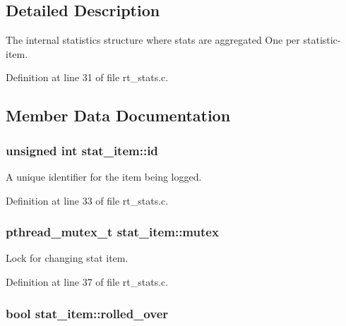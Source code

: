 \subsection{Detailed Description}
The internal statistics structure where stats are aggregated One per statistic-\/item. 

Definition at line 31 of file rt\-\_\-stats.\-c.



\subsection{Member Data Documentation}
\hypertarget{structstat__item_a8f48ef423c6bb652d59e567f3585f6bd}{
\subsubsection[{id}]{\setlength{\rightskip}{0pt plus 5cm}unsigned int stat\-\_\-item\-::id}}\label{structstat__item_a8f48ef423c6bb652d59e567f3585f6bd}


A unique identifier for the item being logged. 



Definition at line 33 of file rt\-\_\-stats.\-c.

\hypertarget{structstat__item_a5dc6d221657bec60e0613ef64ea6ee28}{
\subsubsection[{mutex}]{\setlength{\rightskip}{0pt plus 5cm}pthread\-\_\-mutex\-\_\-t stat\-\_\-item\-::mutex}}\label{structstat__item_a5dc6d221657bec60e0613ef64ea6ee28}


Lock for changing stat item. 



Definition at line 37 of file rt\-\_\-stats.\-c.

\hypertarget{structstat__item_ac8339e9dc15d83bd0e8a4de598427b56}{
\subsubsection[{rolled\-\_\-over}]{\setlength{\rightskip}{0pt plus 5cm}bool stat\-\_\-item\-::rolled\-\_\-over}}\label{structstat__item_ac8339e9dc15d83bd0e8a4de598427b56}


